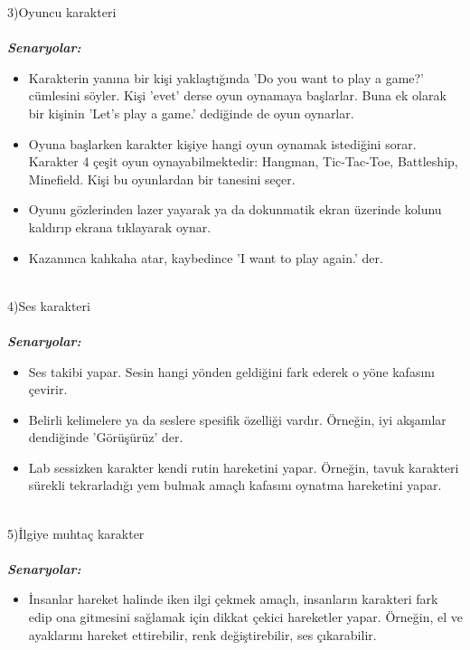 \documentclass[11pt]{article}
\begin{document}
{\Large 3)Oyuncu karakteri}
\\\\
\textbf{\textit{Senaryolar:}}\
\begin{itemize}
\item Karakterin yanına bir kişi yaklaştığında 'Do you want to play a game?' cümlesini söyler. Kişi 'evet' derse oyun oynamaya başlarlar. Buna ek olarak bir kişinin 'Let's play a game.' dediğinde de oyun oynarlar.\\
\item Oyuna başlarken karakter kişiye hangi oyun oynamak istediğini sorar. Karakter 4 çeşit oyun oynayabilmektedir: Hangman, Tic-Tac-Toe, Battleship, Minefield. Kişi bu oyunlardan bir tanesini seçer.\\
\item Oyunu gözlerinden lazer yayarak ya da dokunmatik ekran üzerinde kolunu kaldırıp ekrana tıklayarak oynar.\\
\item Kazanınca kahkaha atar, kaybedince 'I want to play again.' der.\\\\
\end{itemize}
{\Large 4)Ses karakteri}
\\\\
\textbf{\textit{Senaryolar:}}\
\begin{itemize}
\item Ses takibi yapar. Sesin hangi yönden geldiğini fark ederek o yöne kafasını çevirir.\\
\item Belirli kelimelere ya da seslere spesifik özelliği vardır. Örneğin, iyi akşamlar dendiğinde 'Görüşürüz' der.\\
\item Lab sessizken karakter kendi rutin hareketini yapar. Örneğin, tavuk karakteri sürekli tekrarladığı yem bulmak amaçlı kafasını oynatma hareketini yapar.\\\\
\end{itemize}
{\Large 5)İlgiye muhtaç karakter}
\\\\
\textbf{\textit{Senaryolar:}}\
\begin{itemize}
\item İnsanlar hareket halinde iken ilgi çekmek amaçlı, insanların karakteri fark edip ona gitmesini sağlamak için dikkat çekici hareketler yapar. Örneğin, el ve ayaklarını hareket ettirebilir, renk değiştirebilir, ses çıkarabilir. \\\\
\end{itemize}
\end{document}
